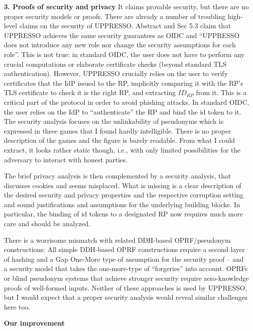 \documentclass[letterpaper,onecolumn,10pt]{article}
\begin{document}
\vspace{1mm}\noindent\textbf{3. Proofs of security and privacy}
It claims provable security, but there are no proper security models or proofs.
There are already a number of troubling high-level claims on the security of UPPRESSO.
Abstract and Sec 5.3 claim that UPPRESSO achieves the same security guarantees as OIDC and ``UPPRESSO does not introduce any new role nor change the security assumptions for each role''.
This is not true: in standard OIDC, the user does not have to perform any crucial computations or elaborate certificate checks (beyond standard TLS authentication).
However, UPPRESSO crucially relies on the user to verify certificates that the IdP issued to the RP, implicitly comparing it with the RP's TLS certificate to check it is the right RP, and extracting $ID_{RP}$ from it.
This is a critical part of the protocol in order to avoid phishing attacks. In standard OIDC, the user relies on the IdP to ``authenticate'' the RP and bind the id token to it.
The security analysis focuses on the unlinkability of pseudonyms which is expressed in three games that I found hardly intelligible.
There is no proper description of the games and the figure is barely readable.
From what I could extract, it looks rather static though, i.e., with only limited possibilities for the adversary to interact with honest parties.

The brief privacy analysis is then complemented by a security analysis, that discusses cookies and seems misplaced.
What is missing is a clear description of the desired security and privacy properties and the respective corruption setting and sound justifications and assumptions for the underlying building blocks. In particular, the binding of id tokens to a designated RP now requires much more care and should be analyzed.

There is a worrisome mismatch with related DDH-based OPRF/pseudonym constructions:
All simple DDH-based OPRF constructions require a second layer of hashing and a Gap One-More type of assumption for the security proof -- and a security model that takes the one-more-type of ``forgeries'' into account.
OPRFs or blind pseudonym systems that achieve stronger security require zero-knowledge proofs of well-formed inputs. Neither of these approaches is used by UPPRESSO, but I would expect that a proper security analysis would reveal similar challenges here too.



\vspace{1mm}\noindent\textbf{Our improvement}
\end{document}
